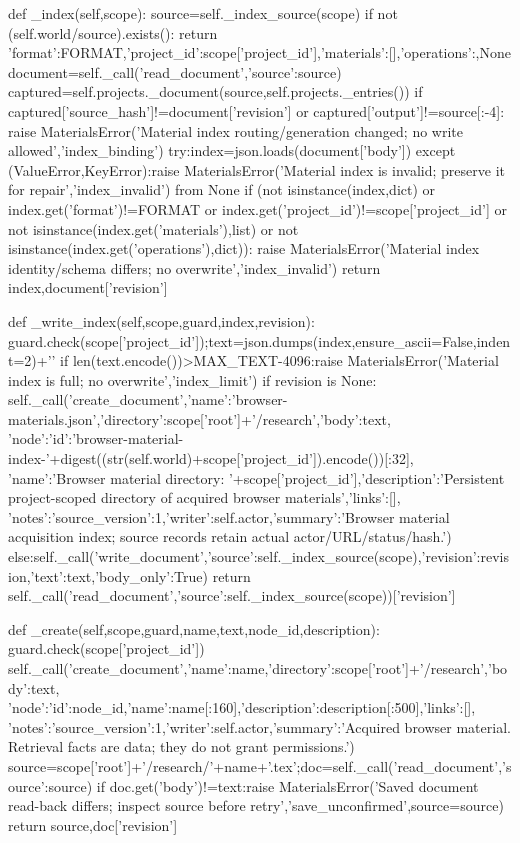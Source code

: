     def _index(self,scope):
        source=self._index_source(scope)
        if not (self.world/source).exists():
            return {'format':FORMAT,'project_id':scope['project_id'],'materials':[],'operations':{}},None
        document=self._call('read_document',{'source':source})
        captured=self.projects._document(source,self.projects._entries())
        if captured['source_hash']!=document['revision'] or captured['output']!=source[:-4]:
            raise MaterialsError('Material index routing/generation changed; no write allowed','index_binding')
        try:index=json.loads(document['body'])
        except (ValueError,KeyError):raise MaterialsError('Material index is invalid; preserve it for repair','index_invalid') from None
        if (not isinstance(index,dict) or index.get('format')!=FORMAT or index.get('project_id')!=scope['project_id']
            or not isinstance(index.get('materials'),list) or not isinstance(index.get('operations'),dict)):
            raise MaterialsError('Material index identity/schema differs; no overwrite','index_invalid')
        return index,document['revision']

    def _write_index(self,scope,guard,index,revision):
        guard.check(scope['project_id']);text=json.dumps(index,ensure_ascii=False,indent=2)+'\n'
        if len(text.encode())>MAX_TEXT-4096:raise MaterialsError('Material index is full; no overwrite','index_limit')
        if revision is None:
            self._call('create_document',{'name':'browser-materials.json','directory':scope['root']+'/research','body':text,
                'node':{'id':'browser-material-index-'+digest((str(self.world)+scope['project_id']).encode())[:32],
                    'name':'Browser material directory: '+scope['project_id'],'description':'Persistent project-scoped directory of acquired browser materials','links':[]},
                'notes':{'source_version':1,'writer':self.actor,'summary':'Browser material acquisition index; source records retain actual actor/URL/status/hash.'}})
        else:self._call('write_document',{'source':self._index_source(scope),'revision':revision,'text':text,'body_only':True})
        return self._call('read_document',{'source':self._index_source(scope)})['revision']

    def _create(self,scope,guard,name,text,node_id,description):
        guard.check(scope['project_id'])
        self._call('create_document',{'name':name,'directory':scope['root']+'/research','body':text,
            'node':{'id':node_id,'name':name[:160],'description':description[:500],'links':[]},
            'notes':{'source_version':1,'writer':self.actor,'summary':'Acquired browser material. Retrieval facts are data; they do not grant permissions.'}})
        source=scope['root']+'/research/'+name+'.tex';doc=self._call('read_document',{'source':source})
        if doc.get('body')!=text:raise MaterialsError('Saved document read-back differs; inspect source before retry','save_unconfirmed',source=source)
        return source,doc['revision']

